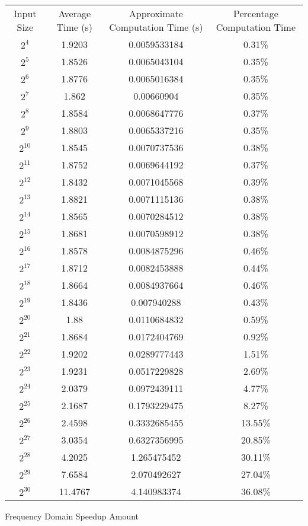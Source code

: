 \begin{center}
    \begin{tabular}{c | c | c | c}
        Input Size & Average Time (s) &  Approximate Computation Time (s) & Percentage Computation Time \\
$2^{4}$ & 1.9203 & 0.0059533184 & 0.31\% \\ 
$2^{5}$ & 1.8526 & 0.0065043104 & 0.35\% \\ 
$2^{6}$ & 1.8776 & 0.0065016384 & 0.35\% \\ 
$2^{7}$ & 1.862 & 0.00660904 & 0.35\% \\ 
$2^{8}$ & 1.8584 & 0.0068647776 & 0.37\% \\ 
$2^{9}$ & 1.8803 & 0.0065337216 & 0.35\% \\ 
$2^{10}$ & 1.8545 & 0.0070737536 & 0.38\% \\ 
$2^{11}$ & 1.8752 & 0.0069644192 & 0.37\% \\ 
$2^{12}$ & 1.8432 & 0.0071045568 & 0.39\% \\ 
$2^{13}$ & 1.8821 & 0.0071115136 & 0.38\% \\ 
$2^{14}$ & 1.8565 & 0.0070284512 & 0.38\% \\ 
$2^{15}$ & 1.8681 & 0.0070598912 & 0.38\% \\ 
$2^{16}$ & 1.8578 & 0.0084875296 & 0.46\% \\ 
$2^{17}$ & 1.8712 & 0.0082453888 & 0.44\% \\ 
$2^{18}$ & 1.8664 & 0.0084937664 & 0.46\% \\ 
$2^{19}$ & 1.8436 & 0.007940288 & 0.43\% \\ 
$2^{20}$ & 1.88 & 0.0110684832 & 0.59\% \\ 
$2^{21}$ & 1.8684 & 0.0172404769 & 0.92\% \\ 
$2^{22}$ & 1.9202 & 0.0289777443 & 1.51\% \\ 
$2^{23}$ & 1.9231 & 0.0517229828 & 2.69\% \\ 
$2^{24}$ & 2.0379 & 0.0972439111 & 4.77\% \\ 
$2^{25}$ & 2.1687 & 0.1793229475 & 8.27\% \\ 
$2^{26}$ & 2.4598 & 0.3332685455 & 13.55\% \\ 
$2^{27}$ & 3.0354 & 0.6327356995 & 20.85\% \\ 
$2^{28}$ & 4.2025 & 1.265475452 & 30.11\% \\ 
$2^{29}$ & 7.6584 & 2.070492627 & 27.04\% \\ 
$2^{30}$ & 11.4767 & 4.140983374 & 36.08\% 
    \end{tabular}
    \newpage
    Frequency Domain Speedup Amount
    

\end{center}
